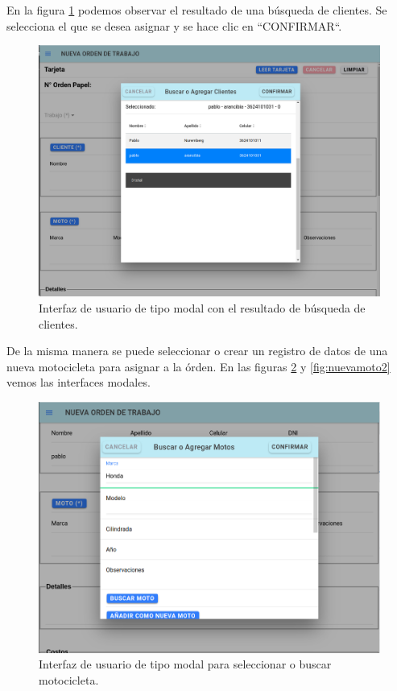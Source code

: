 En la figura \ref{fig:nuevacliente2} podemos observar el resultado de una búsqueda de clientes. Se selecciona el que se desea asignar y se hace clic en ``CONFIRMAR``.

\begin{figure}[H]
	\centering
	\includegraphics[scale=.30]{./Figures/nueva-clientes-2.png}
	\caption{Interfaz de usuario de tipo modal con el resultado de búsqueda de clientes.}
	\label{fig:nuevacliente2}
\end{figure}

De la misma manera se puede seleccionar o crear un registro de datos de una nueva motocicleta para asignar a la órden. En las figuras \ref{fig:nuevamoto1} y \ref{fig:nuevamoto2} vemos las interfaces modales.


\begin{figure}[H]
	\centering
	\includegraphics[scale=.30]{./Figures/nueva-moto-1.png}
	\caption{Interfaz de usuario de tipo modal para seleccionar o buscar motocicleta.}
	\label{fig:nuevamoto1}
\end{figure}

